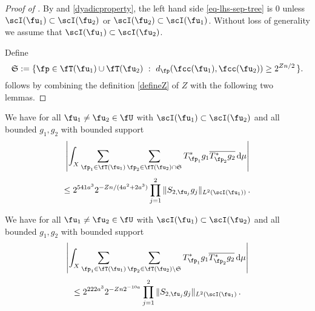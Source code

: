 \begin{proof}[Proof of ]
    By  and \eqref{dyadicproperty}, the left hand side \eqref{eq-lhs-sep-tree} is $0$ unless $\scI(\fu_1) \subset \scI(\fu_2)$ or $\scI(\fu_2) \subset \scI(\fu_1)$. Without loss of generality we assume that $\scI(\fu_1) \subset \scI(\fu_2)$.

    Define
    \begin{equation}
        \label{def-Tree-S-set}
         \mathfrak{S} := \{\fp \in \fT(\fu_1) \cup \fT(\fu_2) \ : \ d_{\fp}(\fcc(\fu_1), \fcc(\fu_2)) \ge 2^{Zn/2}\,\}.
    \end{equation}
     follows by combining the definition \eqref{defineZ} of $Z$ with the following two lemmas.
\end{proof}

\begin{lemma}
        \label{correlation-distant-tree-parts}
        We have for all $\fu_1 \ne \fu_2 \in \fU$ with $\scI(\fu_1) \subset \scI(\fu_2)$ and all bounded $g_1, g_2$ with bounded support
        \begin{equation}
            \label{eq-lhs-big-sep-tree}
            \left| \int_X \sum_{\fp_1 \in \fT(\fu_1)} \sum_{\fp_2 \in \fT(\fu_2) \cap \mathfrak{S}} T^*_{\fp_1}g_1 \overline{T^*_{\fp_2}g_2 }\,\mathrm{d}\mu \right|
        \end{equation}
        \begin{equation}
            \label{eq-rhs-big-sep-tree}
            \le 2^{541a^3} 2^{-Zn/(4a^2 + 2a^3)} \prod_{j =1}^2 \| S_{2, \fu_j} g_j\|_{L^2(\scI(\fu_1))}\,.
        \end{equation}
    \end{lemma}
    \begin{lemma}
        \label{correlation-near-tree-parts}
        We have for all $\fu_1 \ne \fu_2 \in \fU$ with $\scI(\fu_1) \subset \scI(\fu_2)$ and all bounded $g_1, g_2$ with bounded support
        \begin{equation}
            \label{eq-lhs-small-sep-tree}
            \left| \int_X \sum_{\fp_1 \in \fT(\fu_1)} \sum_{\fp_2 \in \fT(\fu_2) \setminus \mathfrak{S}} T^*_{\fp_1}g_1 \overline{T^*_{\fp_2}g_2 }\,\mathrm{d}\mu \right|
        \end{equation}
        \begin{equation}
            \label{eq-rhs-small-sep-tree}
            \le 2^{222a^3} 2^{-Zn 2^{-10a}} \prod_{j =1}^2 \| S_{2, \fu_j} g_j\|_{L^2(\scI(\fu_1)}\,.
        \end{equation}
    \end{lemma}


